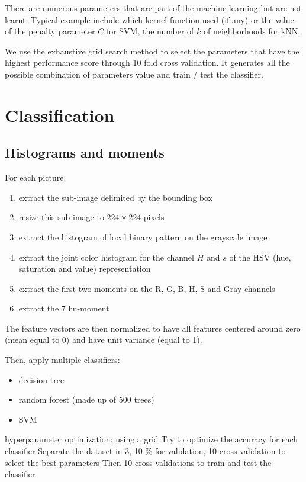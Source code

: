 There are numerous parameters that are part of the machine learning but are not learnt. Typical example include which kernel function used (if any) or the value of the penalty parameter $C$ for SVM, the number of $k$ of neighborhoods for kNN.

We use the exhaustive grid search method to select the parameters that have the highest performance score through 10 fold cross validation. It generates all the possible combination of parameters value and train / test the classifier.

\section{Classification}

\subsection{Histograms and moments}

For each picture:
\begin{enumerate}
    \item extract the sub-image delimited by the bounding box
    \item resize this sub-image to $224 \times 224$ pixels
    \item extract the histogram of local binary pattern on the grayscale image
    \item extract the joint color histogram for the channel $H$ and $s$ of the HSV (hue, saturation and value) representation
    \item extract the first two moments on the R, G, B, H, S and Gray channels
    \item extract the 7 hu-moment
\end{enumerate}

The feature vectors are then normalized to have all features centered around zero (mean equal to 0) and have unit variance (equal to 1).

Then, apply multiple classifiers:
\begin{itemize}
    \item decision tree
    \item random forest (made up of 500 trees)
    \item SVM
\end{itemize}

hyperparameter optimization: using a grid
Try to optimize the accuracy for each classifier
Separate the dataset in 3, 10 \% for validation, 10 cross validation to select the best parameters
Then 10 cross validations to train and test the classifier


